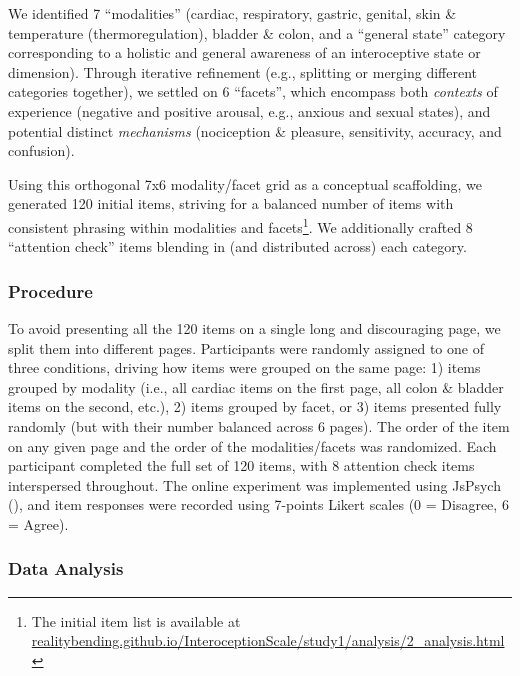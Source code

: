 \documentclass[
  jou,
  floatsintext,
  longtable,
  nolmodern,
  notxfonts,
  notimes,
  colorlinks=true,linkcolor=blue,citecolor=blue,urlcolor=blue]{apa7}
\begin{document}
We identified 7 ``modalities'' (cardiac, respiratory, gastric, genital,
skin \& temperature (thermoregulation), bladder \& colon, and a
``general state'' category corresponding to a holistic and general
awareness of an interoceptive state or dimension). Through iterative
refinement (e.g., splitting or merging different categories together),
we settled on 6 ``facets'', which encompass both \emph{contexts} of
experience (negative and positive arousal, e.g., anxious and sexual
states), and potential distinct \emph{mechanisms} (nociception \&
pleasure, sensitivity, accuracy, and confusion).

Using this orthogonal 7x6 modality/facet grid as a conceptual
scaffolding, we generated 120 initial items, striving for a balanced
number of items with consistent phrasing within modalities and
facets\footnote{The initial item list is available at
  \href{https://realitybending.github.io/InteroceptionScale/study1/analysis/2_analysis.html}{realitybending.github.io/InteroceptionScale/study1/analysis/2\_analysis.html}}.
We additionally crafted 8 ``attention check'' items blending in (and
distributed across) each category.

\subsubsection{Procedure}\label{procedure}

To avoid presenting all the 120 items on a single long and discouraging
page, we split them into different pages. Participants were randomly
assigned to one of three conditions, driving how items were grouped on
the same page: 1) items grouped by modality (i.e., all cardiac items on
the first page, all colon \& bladder items on the second, etc.), 2)
items grouped by facet, or 3) items presented fully randomly (but with
their number balanced across 6 pages). The order of the item on any
given page and the order of the modalities/facets was randomized. Each
participant completed the full set of 120 items, with 8 attention check
items interspersed throughout. The online experiment was implemented
using JsPsych (), and item
responses were recorded using 7-points Likert scales (0 = Disagree, 6 =
Agree).

\subsubsection{Data Analysis}\label{data-analysis}
\end{document}

